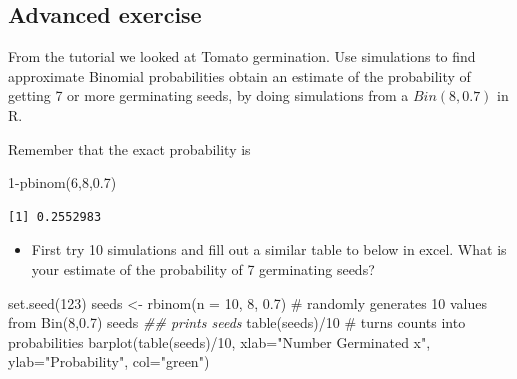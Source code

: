 \documentclass[
  10pt,
  letterpaper,
  DIV=11,
  numbers=noendperiod]{scrartcl}
\newenvironment{Shaded}{\begin{snugshade}}{\end{snugshade}}
\newcommand{\AttributeTok}[1]{\textcolor[rgb]{0.40,0.45,0.13}{#1}}
\newcommand{\CommentTok}[1]{\textcolor[rgb]{0.37,0.37,0.37}{#1}}
\newcommand{\DecValTok}[1]{\textcolor[rgb]{0.68,0.00,0.00}{#1}}
\newcommand{\DocumentationTok}[1]{\textcolor[rgb]{0.37,0.37,0.37}{\textit{#1}}}
\newcommand{\FloatTok}[1]{\textcolor[rgb]{0.68,0.00,0.00}{#1}}
\newcommand{\FunctionTok}[1]{\textcolor[rgb]{0.28,0.35,0.67}{#1}}
\newcommand{\NormalTok}[1]{\textcolor[rgb]{0.00,0.23,0.31}{#1}}
\newcommand{\OtherTok}[1]{\textcolor[rgb]{0.00,0.23,0.31}{#1}}
\newcommand{\SpecialCharTok}[1]{\textcolor[rgb]{0.37,0.37,0.37}{#1}}
\newcommand{\StringTok}[1]{\textcolor[rgb]{0.13,0.47,0.30}{#1}}
\providecommand{\tightlist}{%
  \setlength{\itemsep}{0pt}\setlength{\parskip}{0pt}}\usepackage{longtable,booktabs,array}
\begin{document}
\hypertarget{advanced-exercise}{%
\subsection{Advanced exercise}\label{advanced-exercise}}

From the tutorial we looked at Tomato germination. Use simulations to
find approximate Binomial probabilities obtain an estimate of the
probability of getting 7 or more germinating seeds, by doing simulations
from a \(Bin(8, 0.7)\) in R.

Remember that the exact probability is

\begin{Shaded}
\begin{Highlighting}[]
\DecValTok{1}\SpecialCharTok{{-}}\FunctionTok{pbinom}\NormalTok{(}\DecValTok{6}\NormalTok{,}\DecValTok{8}\NormalTok{,}\FloatTok{0.7}\NormalTok{)}
\end{Highlighting}
\end{Shaded}

\begin{verbatim}
[1] 0.2552983
\end{verbatim}

\begin{itemize}
\tightlist
\item
  First try 10 simulations and fill out a similar table to below in
  excel. What is your estimate of the probability of 7 germinating
  seeds?
\end{itemize}

\begin{Shaded}
\begin{Highlighting}[]
\FunctionTok{set.seed}\NormalTok{(}\DecValTok{123}\NormalTok{)}
\NormalTok{seeds }\OtherTok{\textless{}{-}} \FunctionTok{rbinom}\NormalTok{(}\AttributeTok{n =} \DecValTok{10}\NormalTok{, }\DecValTok{8}\NormalTok{, }\FloatTok{0.7}\NormalTok{) }\CommentTok{\# randomly generates 10 values from Bin(8,0.7)}
\NormalTok{seeds }\DocumentationTok{\#\# prints seeds}
\FunctionTok{table}\NormalTok{(seeds)}\SpecialCharTok{/}\DecValTok{10} \CommentTok{\# turns counts into probabilities}
\FunctionTok{barplot}\NormalTok{(}\FunctionTok{table}\NormalTok{(seeds)}\SpecialCharTok{/}\DecValTok{10}\NormalTok{, }\AttributeTok{xlab=}\StringTok{"Number Germinated x"}\NormalTok{, }\AttributeTok{ylab=}\StringTok{"Probability"}\NormalTok{, }\AttributeTok{col=}\StringTok{"green"}\NormalTok{)}
\end{Highlighting}
\end{Shaded}
\end{document}
